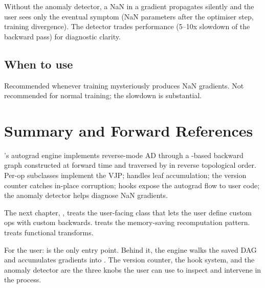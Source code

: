Without the anomaly detector, a NaN in a gradient propagates
silently and the user sees only the eventual symptom (NaN
parameters after the optimiser step, training divergence). The
detector trades performance (5--10x slowdown of the backward
pass) for diagnostic clarity.

\subsection{When to use}
\label{ssec:autograd_engine:anomaly_when}

Recommended whenever training mysteriously produces NaN
gradients. Not recommended for normal training; the slowdown is
substantial.

\section{Summary and Forward References}
\label{sec:autograd_engine:summary}

\Lucid's autograd engine implements reverse-mode AD through a
-based backward graph constructed at forward time and
traversed by  in reverse topological
order. Per-op  subclasses implement the VJP;
 handles leaf accumulation; the version
counter catches in-place corruption; hooks expose the autograd
flow to user code; the anomaly detector helps diagnose NaN
gradients.

The next chapter, , treats the
user-facing  class that lets the user define
custom ops with custom backwards.
 treats the memory-saving
recomputation pattern.  treats functional
transforms.

\begin{lucidnote}
For the user:  is the only entry point.
Behind it, the engine walks the saved DAG and accumulates
gradients into . The version counter, the hook
system, and the anomaly detector are the three knobs the user can
use to inspect and intervene in the process.
\end{lucidnote}
